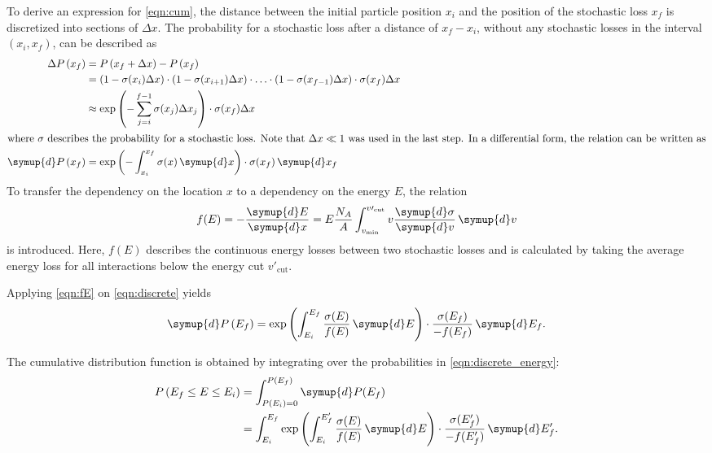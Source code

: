 To derive an expression for \eqref{eqn:cum}, the distance between the initial particle position $x_i$ and the position of the stochastic loss $x_f$ is discretized into sections of $\Delta x$.
The probability for a stochastic loss after a distance of $x_f - x_i$, without any stochastic losses in the interval $\left(x_i, x_f\right)$, can be described as
%
\begin{equation}
	\label{eqn:discrete}
	\begin{split}
	\Delta P\left(x_f\right) &= P\left( x_f + \Delta x \right) - P\left( x_f \right)\\
	&= \left( 1 - \sigma(x_i) \Delta x \right) \cdot \left( 1 - \sigma(x_{i+1}) \Delta x \right) \cdot\ldots\cdot \left( 1 - \sigma(x_{f-1}) \Delta x \right) \cdot \sigma(x_f) \Delta x \\
	&\approx \exp \left( - \sum_{j=i}^{f-1} \sigma(x_j) \Delta x_j \right) \cdot \sigma(x_f) \Delta x\\
	\intertext{where $\sigma$ describes the probability for a stochastic loss. Note that $\Delta x \ll 1$ was used in the last step. In a differential form, the relation can be written as}
	\symup{d}P\left( x_f \right) &= \exp\left(-\int_{x_i}^{x_f} \sigma(x) \, \symup{d}x \right) \cdot \sigma(x_f) \, \symup{d} x_f
	\end{split}
\end{equation}
%
To transfer the dependency on the location $x$ to a dependency on the energy $E$, the relation
%
\begin{equation}
	\label{eqn:fE}
	f(E) = -\frac{\symup{d}E}{\symup{d}x} = E \frac{N_A}{A} \int_{v_\text{min}}^{v\prime_\text{cut}} v \frac{\symup{d}\sigma}{\symup{d}v} \, \symup{d}v
\end{equation}
%
is introduced.
Here, $f(E)$ describes the continuous energy losses between two stochastic losses and is calculated by taking the average energy loss for all interactions below the energy cut $v\prime_\text{cut}$.

Applying \eqref{eqn:fE} on \eqref{eqn:discrete} yields
%
\begin{equation}
	\label{eqn:discrete_energy}
	\symup{d}P\left(E_f\right) = \exp \left( \int_{E_i}^{E_f} \frac{\sigma(E)}{ f(E) } \, \symup{d}E \right) \cdot \frac{\sigma(E_f)}{-f(E_f)} \, \symup{d}E_f.
\end{equation}

The cumulative distribution function is obtained by integrating over the probabilities in \eqref{eqn:discrete_energy}:
%
\begin{equation}
	\label{eqn:cum_detail}
	\begin{split}
	P\left(E_f \leq E \leq E_i\right) &= \int_{P(E_i)=0}^{P(E_f)} \symup{d}P(E_f)\\
	&= \int_{E_i}^{E_f} \exp \left( \int_{E_i}^{E_f'} \frac{\sigma(E)}{ f(E) } \, \symup{d}E \right) \cdot \frac{\sigma(E'_f)}{-f(E'_f)} \, \symup{d}E'_f.
	\end{split}
\end{equation}

